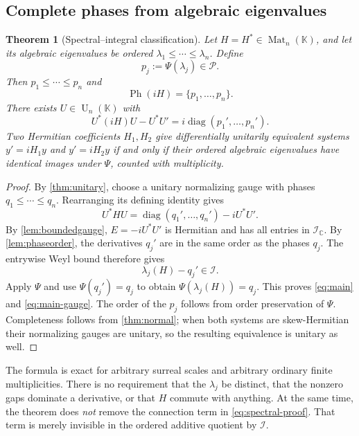 \documentclass[11pt,a4paper]{article}
\numberwithin{equation}{section}
\newtheorem{theorem}{Theorem}[section]
\theoremstyle{definition}
\theoremstyle{remark}
\newcommand{\K}{\mathbb K}
\newcommand{\C}{\mathbb C}
\newcommand{\PP}{\mathcal P}
\newcommand{\II}{\mathcal I}
\newcommand{\diag}{\operatorname{diag}}
\newcommand{\UU}{\operatorname U}
\newcommand{\Specph}{\operatorname{Ph}}
\newcommand{\Mat}{\operatorname{Mat}}
\begin{document}
\subsection{Complete phases from algebraic eigenvalues}
\begin{theorem}[Spectral--integral classification]\label{thm:main}
Let $H=H^*\in\Mat_n(\K)$, and let its algebraic eigenvalues be ordered
$\lambda_1\le\cdots\le\lambda_n$. Define
\[
 p_j:=\Psi(\lambda_j)\in\PP.
\]
Then $p_1\le\cdots\le p_n$ and
\begin{equation}\label{eq:main}
 \Specph(iH)=\{p_1,\ldots,p_n\}.
\end{equation}
There exists $U\in\UU_n(\K)$ with
\begin{equation}\label{eq:main-gauge}
 U^*(iH)U-U^*U'=i\diag(p_1',\ldots,p_n').
\end{equation}
Two Hermitian coefficients $H_1,H_2$ give differentially unitarily
equivalent systems $y'=iH_1y$ and $y'=iH_2y$ if and only if their ordered
algebraic eigenvalues have identical images under $\Psi$, counted with
multiplicity.
\end{theorem}
\begin{proof}
By \cref{thm:unitary}, choose a unitary normalizing gauge with phases
$q_1\le\cdots\le q_n$. Rearranging its defining identity gives
\begin{equation}\label{eq:spectral-proof}
 U^*HU=\diag(q_1',\ldots,q_n')-iU^*U'.
\end{equation}
By \cref{lem:boundedgauge}, $E=-iU^*U'$ is Hermitian and has all entries in
$\II_{\C}$. By \cref{lem:phaseorder}, the derivatives $q_j'$ are in the
same order as the phases $q_j$. The entrywise Weyl bound therefore gives
\[
 \lambda_j(H)-q_j'\in\II.
\]
Apply $\Psi$ and use $\Psi(q_j')=q_j$ to obtain
$\Psi(\lambda_j(H))=q_j$. This proves \eqref{eq:main} and
\eqref{eq:main-gauge}. The order of the $p_j$ follows from order
preservation of $\Psi$. Completeness follows from \cref{thm:normal}; when
both systems are skew-Hermitian their normalizing gauges are unitary, so
the resulting equivalence is unitary as well.
\end{proof}

The formula is exact for arbitrary surreal scales and arbitrary ordinary
finite multiplicities. There is no requirement that the $\lambda_j$ be
distinct, that the nonzero gaps dominate a derivative, or that $H$ commute
with anything. At the same time, the theorem does \emph{not} remove the
connection term in \eqref{eq:spectral-proof}. That term is merely invisible
in the ordered additive quotient by $\II$.
\end{document}
